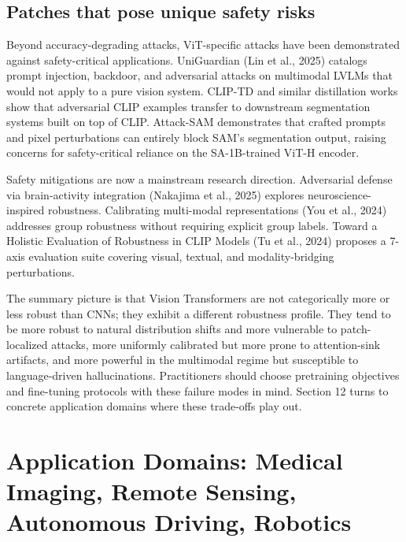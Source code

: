 \documentclass{article}
\begin{document}
\subsection{Patches that pose unique safety risks}\label{patches-that-pose-unique-safety-risks}

Beyond accuracy-degrading attacks, ViT-specific attacks have been demonstrated against safety-critical applications. UniGuardian (Lin et al., 2025) catalogs prompt injection, backdoor, and adversarial attacks on multimodal LVLMs that would not apply to a pure vision system. CLIP-TD and similar distillation works show that adversarial CLIP examples transfer to downstream segmentation systems built on top of CLIP. Attack-SAM \citep{zhang2023vitaev2visiontrans} demonstrates that crafted prompts and pixel perturbations can entirely block SAM's segmentation output, raising concerns for safety-critical reliance on the SA-1B-trained ViT-H encoder.

Safety mitigations are now a mainstream research direction. Adversarial defense via brain-activity integration (Nakajima et al., 2025) explores neuroscience-inspired robustness. Calibrating multi-modal representations (You et al., 2024) addresses group robustness without requiring explicit group labels. Toward a Holistic Evaluation of Robustness in CLIP Models (Tu et al., 2024) proposes a 7-axis evaluation suite covering visual, textual, and modality-bridging perturbations.

The summary picture is that Vision Transformers are not categorically more or less robust than CNNs; they exhibit a different robustness profile. They tend to be more robust to natural distribution shifts and more vulnerable to patch-localized attacks, more uniformly calibrated but more prone to attention-sink artifacts, and more powerful in the multimodal regime but susceptible to language-driven hallucinations. Practitioners should choose pretraining objectives and fine-tuning protocols with these failure modes in mind. Section 12 turns to concrete application domains where these trade-offs play out.

\section{Application Domains: Medical Imaging, Remote Sensing, Autonomous Driving, Robotics}\label{application-domains-medical-imaging-remote-sensing-autonomous-driving-robotics}
\end{document}

